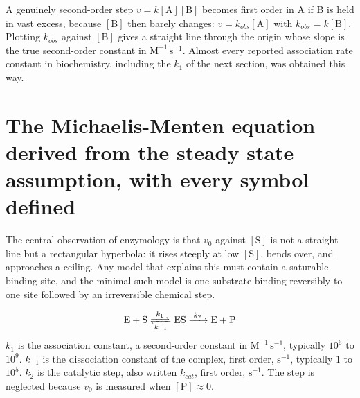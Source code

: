 \begin{obsbox}[title={WORTH NOTICING: pseudo-first-order is how bimolecular steps are measured}]
A genuinely second-order step $v=k[\mathrm{A}][\mathrm{B}]$ becomes first order in A
if B is held in vast excess, because $[\mathrm{B}]$ then barely changes:
$v=k_{obs}[\mathrm{A}]$ with $k_{obs}=k[\mathrm{B}]$. Plotting $k_{obs}$ against
$[\mathrm{B}]$ gives a straight line through the origin whose slope is the true
second-order constant in $\mathrm{M^{-1}\,s^{-1}}$. Almost every reported
association rate constant in biochemistry, including the $k_1$ of the next section,
was obtained this way.
\end{obsbox}

\section{The Michaelis-Menten equation derived from the steady state assumption, with every symbol defined}

The central observation of enzymology is that $v_0$ against $[\mathrm{S}]$ is not a
straight line but a rectangular hyperbola: it rises steeply at low $[\mathrm{S}]$,
bends over, and approaches a ceiling. Any model that explains this must contain a
saturable binding site, and the minimal such model is one substrate binding reversibly
to one site followed by an irreversible chemical step.

\begin{keybox}[title={MEMORIZE: the minimal mechanism and its four rate constants}]
\[
\ce{E + S <=>[$k_1$][$k_{-1}$] ES ->[$k_2$] E + P}
\]
$k_1$ is the association constant, a second-order constant in
$\mathrm{M^{-1}\,s^{-1}}$, typically $10^{6}$ to $10^{9}$. $k_{-1}$ is the
dissociation constant of the complex, first order, $\mathrm{s^{-1}}$, typically
$1$ to $10^{5}$. $k_2$ is the catalytic step, also written $k_{cat}$, first order,
$\mathrm{s^{-1}}$. The step  is neglected because $v_0$ is measured
when $[\mathrm{P}]\approx 0$.
\end{keybox}

